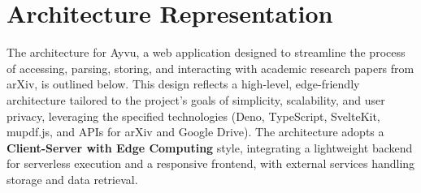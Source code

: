 \documentclass[12pt]{article}
\begin{document}
\section{Architecture Representation}

The architecture for Ayvu, a web application designed to streamline the process of accessing, parsing, storing, and interacting with academic research papers from arXiv, is outlined below. This design reflects a high-level, edge-friendly architecture tailored to the project's goals of simplicity, scalability, and user privacy, leveraging the specified technologies (Deno, TypeScript, SvelteKit, mupdf.js, and APIs for arXiv and Google Drive). The architecture adopts a \textbf{Client-Server with Edge Computing} style, integrating a lightweight backend for serverless execution and a responsive frontend, with external services handling storage and data retrieval.
\end{document}
